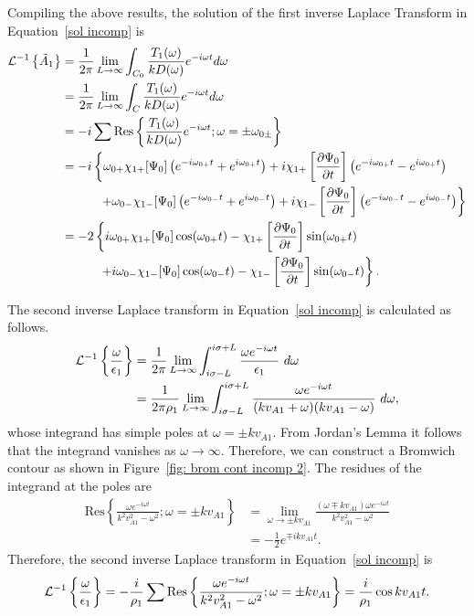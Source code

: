 Compiling the above results, the solution of the first inverse Laplace Transform in Equation~\eqref{sol incomp} is
\begin{align}
\mathcal{L}^{-1}\left\{ \tilde{A}_1 \right\} &= \frac{1}{2\pi} \lim_{L \to \infty} \int_{C_0} \frac{T_1(\omega)}{kD(\omega)} e^{-i\omega t} d\omega \\
&= \frac{1}{2\pi} \lim_{L \to \infty} \int_{C} \frac{T_1(\omega)}{kD(\omega)} e^{-i\omega t} d\omega \notag \\
&= -i \sum \mathrm{Res}\left\{\frac{T_1(\omega)}{kD(\omega)}e^{-i\omega t}; \omega = \pm \omega_{0\pm} \right\} \notag \\
&= -i \left\{\omega_{0+}\chi_{1+}[\Psi_0] \left(e^{-i\omega_{0+} t} + e^{i\omega_{0+} t}\right) + i\chi_{1+}\left[ \frac{\partial \Psi_0}{\partial t} \right] \left(e^{-i\omega_{0+} t} - e^{i\omega_{0+} t}\right) \right. \notag \\
& \qquad\quad \left. + \omega_{0-}\chi_{1-}[\Psi_0] \left(e^{-i\omega_{0-} t} + e^{i\omega_{0-} t}\right) + i\chi_{1-}\left[ \frac{\partial \Psi_0}{\partial t} \right] \left(e^{-i\omega_{0-} t} - e^{i\omega_{0-} t}\right)\right\} \notag \\
&= -2 \left\{ i\omega_{0+}\chi_{1+}[\Psi_0] \cos(\omega_{0+} t) - \chi_{1+}\left[ \frac{\partial \Psi_0}{\partial t} \right] \sin(\omega_{0+} t) \right. \notag \\
& \qquad\quad \left. + i\omega_{0-}\chi_{1-}[\Psi_0] \cos(\omega_{0-} t) - \chi_{1-}\left[ \frac{\partial \Psi_0}{\partial t} \right] \sin(\omega_{0-} t) \right\}.
\end{align}


The second inverse Laplace transform in Equation~\eqref{sol incomp} is calculated as follows.
\begin{align}
\mathcal{L}^{-1}\left\{ \frac{\omega}{\epsilon_1} \right\} &= \frac{1}{2\pi}\lim_{L \to \infty} \int_{i\sigma - L}^{i\sigma + L} \frac{\omega e^{-i\omega t}}{\epsilon_1} ~d\omega \notag \\
&= \frac{1}{2\pi\rho_1}\lim_{L \to \infty} \int_{i\sigma - L}^{i\sigma + L} \frac{\omega e^{-i\omega t}}{(kv_{A1} + \omega)(kv_{A1} - \omega)} ~d\omega,
\end{align}
whose integrand has simple poles at $\omega = \pm k v_{A1}$. From Jordan's Lemma it follows that the integrand vanishes as $\omega \to \infty$. Therefore, we can construct a Bromwich contour as shown in Figure~\ref{fig: brom cont incomp 2}. The residues of the integrand at the poles are
\begin{align}
\mathrm{Res}\left\{\frac{\omega e^{-i\omega t}}{k^2v_{A1}^2 - \omega^2}; \omega = \pm kv_{A1} \right\} &= 
\lim_{\omega \to \pm kv_{A1}} \frac{(\omega \mp kv_{A1}) \omega e^{-i\omega t}}{k^2v_{A1}^2 - \omega^2} \\ 
&= -\frac{1}{2}e^{\mp ikv_{A1} t}.
\end{align}
Therefore, the second inverse Laplace transform in Equation~\eqref{sol incomp} is
\begin{equation}
\mathcal{L}^{-1}\left\{ \frac{\omega}{\epsilon_1} \right\} = -\frac{i}{\rho_1} \sum \mathrm{Res} \left\{ \frac{\omega e^{-i\omega t}}{k^2v_{A1}^2 - \omega^2}; \omega = \pm kv_{A1} \right\} = \frac{i}{\rho_1}\cos{kv_{A1}t}.
\end{equation}

